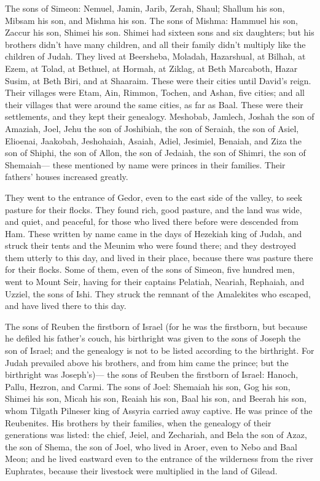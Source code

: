 \myverse{}The sons of Simeon: Nemuel, Jamin, Jarib, Zerah, Shaul;
\myverse{}Shallum his son, Mibsam his son, and Mishma his son.
\myverse{}The sons of Mishma: Hammuel his son, Zaccur his son, Shimei his son.
\myverse{}Shimei had sixteen sons and six daughters; but his brothers didn’t have many
children, and all their family didn’t multiply like the children of Judah.
\myverse{}They lived at Beersheba, Moladah, Hazarshual,
\myverse{}at Bilhah, at Ezem, at Tolad,
\myverse{}at Bethuel, at Hormah, at Ziklag,
\myverse{}at Beth Marcaboth, Hazar Susim, at Beth Biri, and at Shaaraim. These were
their cities until David’s reign.
\myverse{}Their villages were Etam, Ain, Rimmon, Tochen, and Ashan, five cities;
\myverse{}and all their villages that were around the same cities, as far as Baal. These
were their settlements, and they kept their genealogy.
\myverse{}Meshobab, Jamlech, Joshah the son of Amaziah,
\myverse{}Joel, Jehu the son of Joshibiah, the son of Seraiah, the son of Asiel,
\myverse{}Elioenai, Jaakobah, Jeshohaiah, Asaiah, Adiel, Jesimiel, Benaiah,
\myverse{}and Ziza the son of Shiphi, the son of Allon, the son of Jedaiah, the son
of Shimri, the son of Shemaiah—
\myverse{}these mentioned by name were princes in their families. Their fathers’ houses
increased greatly.

\myverse{}They went to the entrance of Gedor, even to the east side of
the valley, to seek pasture for their flocks.
\myverse{}They found rich, good pasture, and the land was wide, and quiet, and peaceful,
for those who lived there before were descended from Ham.
\myverse{}These written by name came in the days of Hezekiah king of Judah, and struck
their tents and the Meunim who were found there; and they destroyed them utterly to this day, and lived
in their place, because there was pasture there for their flocks.
\myverse{}Some of them, even of the sons of Simeon, five hundred men, went to Mount
Seir, having for their captains Pelatiah, Neariah, Rephaiah, and Uzziel, the sons of Ishi.
\myverse{}They struck the remnant of the Amalekites who escaped, and have lived there
to this day.


\mychapter{} \myverse*{}The sons of Reuben the firstborn of Israel (for he was the firstborn,
but because he defiled his father’s couch, his birthright was given to the sons of Joseph the son of Israel;
and the genealogy is not to be listed according to the birthright.
\myverse{}For Judah prevailed above his brothers, and from him came the prince; but the
birthright was Joseph’s)—
\myverse{}the sons of Reuben the firstborn of Israel: Hanoch, Pallu, Hezron, and Carmi.
\myverse{}The sons of Joel: Shemaiah his son, Gog his son, Shimei his son,
\myverse{}Micah his son, Reaiah his son, Baal his son,
\myverse{}and Beerah his son, whom Tilgath Pilneser king of Assyria carried away captive.
He was prince of the Reubenites.
\myverse{}His brothers by their families, when the genealogy of their generations was
listed: the chief, Jeiel, and Zechariah,
\myverse{}and Bela the son of Azaz, the son of Shema, the son of Joel, who lived in Aroer,
even to Nebo and Baal Meon;
\myverse{}and he lived eastward even to the entrance of the wilderness from the river
Euphrates, because their livestock were multiplied in the land of Gilead.

